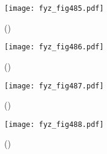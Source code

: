     \begin{figure}[ht!] %
      \centering
      \texttt{[image: fyz\_fig485.pdf]}
      \caption{ 
               (\cite[s.~707]{Feynman01})}
      \label{fyz_fig485}
    \end{figure}

    \begin{figure}[ht!] %
      \centering
      \texttt{[image: fyz\_fig486.pdf]}
      \caption{ 
               (\cite[s.~707]{Feynman01})}
      \label{fyz_fig486}
    \end{figure}

    \begin{figure}[ht!] %
      \centering
      \texttt{[image: fyz\_fig487.pdf]}
      \caption{ 
               (\cite[s.~707]{Feynman01})}
      \label{fyz_fig487}
    \end{figure}

    \begin{figure}[ht!] %
      \centering
      \texttt{[image: fyz\_fig488.pdf]}
      \caption{ 
               (\cite[s.~707]{Feynman01})}
      \label{fyz_fig488}
    \end{figure}
    
    
\printbibliography[title={Seznam literatury}, heading=subbibliography]
